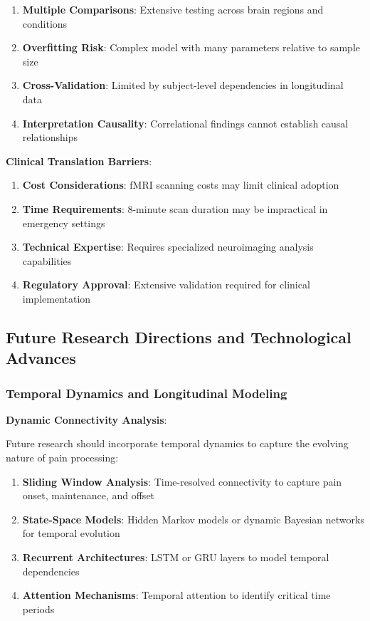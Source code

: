 \documentclass[10pt,journal,compsoc]{IEEEtran}
\begin{document}
\begin{enumerate}
\item \textbf{Multiple Comparisons}: Extensive testing across brain regions and conditions
\item \textbf{Overfitting Risk}: Complex model with many parameters relative to sample size
\item \textbf{Cross-Validation}: Limited by subject-level dependencies in longitudinal data
\item \textbf{Interpretation Causality}: Correlational findings cannot establish causal relationships
\end{enumerate}

\textbf{Clinical Translation Barriers}:

\begin{enumerate}
\item \textbf{Cost Considerations}: fMRI scanning costs may limit clinical adoption
\item \textbf{Time Requirements}: 8-minute scan duration may be impractical in emergency settings
\item \textbf{Technical Expertise}: Requires specialized neuroimaging analysis capabilities
\item \textbf{Regulatory Approval}: Extensive validation required for clinical implementation
\end{enumerate}

\subsection{Future Research Directions and Technological Advances}

\subsubsection{Temporal Dynamics and Longitudinal Modeling}

\textbf{Dynamic Connectivity Analysis}:

Future research should incorporate temporal dynamics to capture the evolving nature of pain processing:

\begin{enumerate}
\item \textbf{Sliding Window Analysis}: Time-resolved connectivity to capture pain onset, maintenance, and offset
\item \textbf{State-Space Models}: Hidden Markov models or dynamic Bayesian networks for temporal evolution
\item \textbf{Recurrent Architectures}: LSTM or GRU layers to model temporal dependencies
\item \textbf{Attention Mechanisms}: Temporal attention to identify critical time periods
\end{enumerate}
\end{document}
